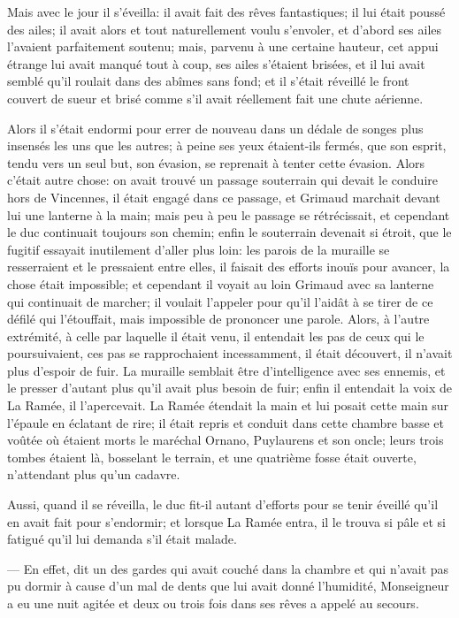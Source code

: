 Mais avec le jour il s'éveilla: il avait fait des rêves fantastiques; il lui était poussé des ailes; il avait alors et tout naturellement voulu s'envoler, et d'abord ses ailes l'avaient parfaitement soutenu; mais, parvenu à une certaine hauteur, cet appui étrange lui avait manqué tout à coup, ses ailes s'étaient brisées, et il lui avait semblé qu'il roulait dans des abîmes sans fond; et il s'était réveillé le front couvert de sueur et brisé comme s'il avait réellement fait une chute aérienne.

Alors il s'était endormi pour errer de nouveau dans un dédale de songes plus insensés les uns que les autres; à peine ses yeux étaient-ils fermés, que son esprit, tendu vers un seul but, son évasion, se reprenait à tenter cette évasion. Alors c'était autre chose: on avait trouvé un passage souterrain qui devait le conduire hors de Vincennes, il était engagé dans ce passage, et Grimaud marchait devant lui une lanterne à la main; mais peu à peu le passage se rétrécissait, et cependant le duc continuait toujours son chemin; enfin le souterrain devenait si étroit, que le fugitif essayait inutilement d'aller plus loin: les parois de la muraille se resserraient et le pressaient entre elles, il faisait des efforts inouïs pour avancer, la chose était impossible; et cependant il voyait au loin Grimaud avec sa lanterne qui continuait de marcher; il voulait l'appeler pour qu'il l'aidât à se tirer de ce défilé qui l'étouffait, mais impossible de prononcer une parole. Alors, à l'autre extrémité, à celle par laquelle il était venu, il entendait les pas de ceux qui le poursuivaient, ces pas se rapprochaient incessamment, il était découvert, il n'avait plus d'espoir de fuir. La muraille semblait être d'intelligence avec ses ennemis, et le presser d'autant plus qu'il avait plus besoin de fuir; enfin il entendait la voix de La Ramée, il l'apercevait. La Ramée étendait la main et lui posait cette main sur l'épaule en éclatant de rire; il était repris et conduit dans cette chambre basse et voûtée où étaient morts le maréchal Ornano, Puylaurens et son oncle; leurs trois tombes étaient là, bosselant le terrain, et une quatrième fosse était ouverte, n'attendant plus qu'un cadavre.

Aussi, quand il se réveilla, le duc fit-il autant d'efforts pour se tenir éveillé qu'il en avait fait pour s'endormir; et lorsque La Ramée entra, il le trouva si pâle et si fatigué qu'il lui demanda s'il était malade.

— En effet, dit un des gardes qui avait couché dans la chambre et qui n'avait pas pu dormir à cause d'un mal de dents que lui avait donné l'humidité, Monseigneur a eu une nuit agitée et deux ou trois fois dans ses rêves a appelé au secours.

